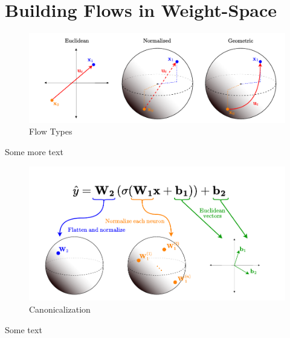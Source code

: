 
\chapter{Building Flows in Weight-Space}\label{chapter:method}

\begin{figure}[h!]
    \centering
    \includegraphics[width=\textwidth]{figures/flow_types.drawio.pdf}
    \caption{\label{fig:flow_types} Flow Types}
\end{figure}

Some more text 

\begin{figure}[h!]
    \centering
    \includegraphics[width=\textwidth]{figures/canonicalization.drawio.pdf}
    \caption{\label{fig:canonicalization} Canonicalization}
\end{figure}

Some text 